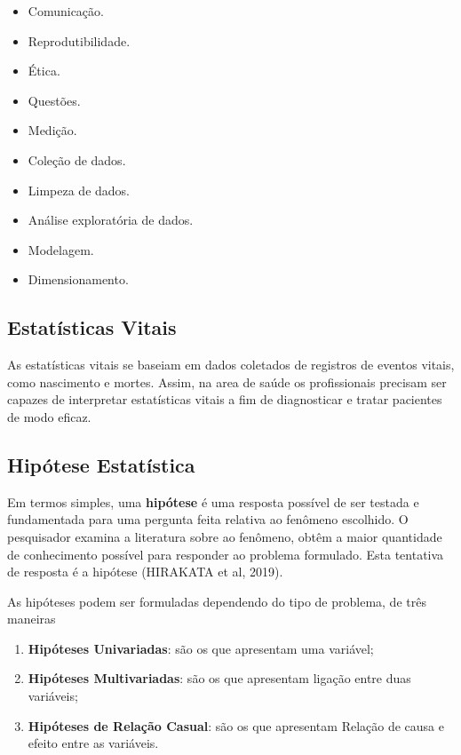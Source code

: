 \begin{itemize}
\item Comunicação.
\item Reprodutibilidade.
\item Ética.
\item Questões.
\item Medição.
\item Coleção de dados.
\item Limpeza de dados.
\item Análise exploratória de dados.
\item Modelagem.
\item Dimensionamento.
\end{itemize}



\newpage
\subsection{Estatísticas Vitais}

As estatísticas vitais se baseiam em dados coletados de registros de eventos vitais, como nascimento e mortes. Assim, na area de saúde os profissionais precisam ser capazes de interpretar  estatísticas vitais a fim de diagnosticar e tratar pacientes de modo eficaz.








\subsection{Hipótese Estatística}

Em termos simples, uma \textbf{hipótese} é uma resposta possível de ser testada e fundamentada para uma pergunta feita relativa ao fenômeno escolhido. O pesquisador examina a literatura sobre ao fenômeno, obtêm a maior quantidade de conhecimento possível para responder ao problema formulado. Esta tentativa de resposta é a hipótese (HIRAKATA et al, 2019).\vskip0.3cm    

As hipóteses podem ser formuladas dependendo do tipo de problema, de três maneiras


\begin{enumerate}
\item \textbf{Hipóteses Univariadas}: são os que apresentam uma variável;  
\item \textbf{Hipóteses Multivariadas}: são os que apresentam ligação entre duas variáveis;
\item \textbf{Hipóteses de Relação Casual}: são os que apresentam Relação de causa e efeito entre as variáveis.
\end{enumerate}


